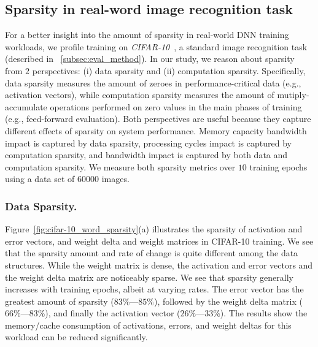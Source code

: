 \subsection{Sparsity in real-word image recognition task}
\label{subsec:sparsity_profile}

For a better insight into the amount of sparsity in real-world DNN training workloads, we profile training on {\it CIFAR-10}~\cite{KrizhevskyThesis}, a standard image recognition task (described in ~\ref{subsec:eval_method}).  In our study, we reason about sparsity from $2$ perspectives: (i) data sparsity and (ii) computation sparsity.  Specifically, data sparsity measures the amount of zeroes in performance-critical data (e.g., activation vectors), while computation sparsity measures the amount of mutiply-accumulate operations performed on zero values in the main phases of training (e.g., feed-forward evaluation).  Both perspectives are useful because they capture different effects of sparsity on system performance.  Memory capacity bandwidth impact is captured by data sparsity, processing cycles impact is captured by computation sparsity, and bandwidth impact is captured by both data and computation sparsity.  We measure both sparsity metrics over $10$ training epochs using a data set of $60000$ images. 

\subsubsection{Data Sparsity.} 

Figure~\ref{fig:cifar-10_word_sparsity}(a) illustrates the sparsity of activation and error vectors, and weight delta and weight matrices in CIFAR-10 training.  We see that the sparsity amount and rate of change is quite different among the data structures.  While the weight matrix is dense, the activation and error vectors and the weight delta matrix are noticeably sparse.  We see that sparsity generally increases with training epochs, albeit at varying rates.  The error vector has the greatest amount of sparsity ($83\%$---$85\%$), followed by the weight delta matrix ($66\%$---$83\%$), and finally the activation vector ($26\%$---$33\%$).  The results show the memory/cache consumption of activations, errors, and weight deltas for this workload can be reduced significantly. 

